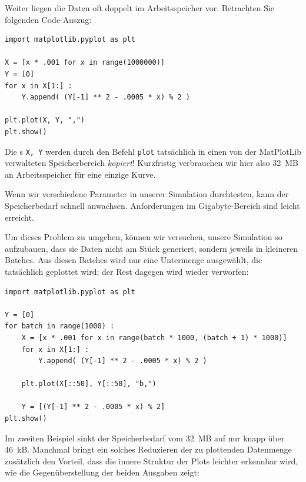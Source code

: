 \begin{hintbox}[]
Weiter liegen die Daten oft doppelt im Arbeitsspeicher vor. Betrachten Sie folgenden Code-Auszug:

\begin{codebox}
\begin{verbatim}
import matplotlib.pyplot as plt

X = [x * .001 for x in range(1000000)]
Y = [0]
for x in X[1:] :
    Y.append( (Y[-1] ** 2 - .0005 * x) % 2 )

plt.plot(X, Y, ",")
plt.show()
\end{verbatim}
\end{codebox}
Die s \texttt{X, Y} werden durch den Befehl \texttt{plot} tatsächlich in einen von der MatPlotLib verwalteten Speicherbereich \emph{kopiert}! Kurzfristig verbrauchen wir hier also \SI{32}{MB} an Arbeitsspeicher für eine einzige Kurve.

Wenn wir verschiedene Parameter in unserer Simulation durchtesten, kann der Speicherbedarf schnell anwachsen. Anforderungen im Gigabyte-Bereich sind leicht erreicht.

Um dieses Problem zu umgehen, können wir versuchen, unsere Simulation so aufzubauen, dass sie Daten nicht am Stück generiert, sondern jeweils in kleineren Batches. Aus diesen Batches wird nur eine Untermenge ausgewählt, die tatsächlich geplottet wird; der Rest dagegen wird wieder verworfen:

\begin{codebox}
\begin{verbatim}
import matplotlib.pyplot as plt

Y = [0]
for batch in range(1000) :
    X = [x * .001 for x in range(batch * 1000, (batch + 1) * 1000)]
    for x in X[1:] :
        Y.append( (Y[-1] ** 2 - .0005 * x) % 2 )
    
    plt.plot(X[::50], Y[::50], "b,")
    
    Y = [(Y[-1] ** 2 - .0005 * x) % 2]
plt.show()
\end{verbatim}
\end{codebox}

Im zweiten Beispiel sinkt der Speicherbedarf vom \SI{32}{MB} auf nur knapp über \SI{46}{kB}. Manchmal bringt ein solches Reduzieren der zu plottenden Datenmenge zusätzlich den Vorteil, dass die innere Struktur der Plots leichter erkennbar wird, wie die Gegenüberstellung der beiden Ausgaben zeigt:
\end{hintbox}
